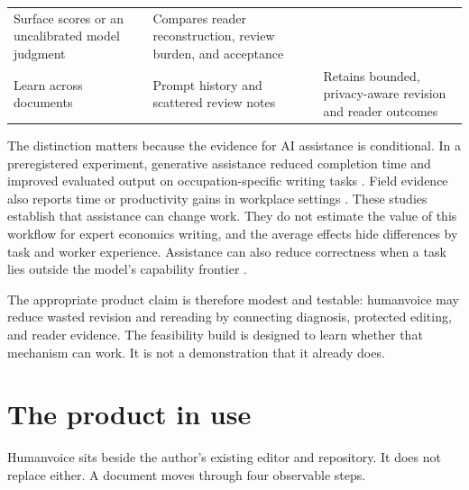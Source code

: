 \documentclass[
  11pt,
  english,
]{article}
\begin{document}
\begin{longtable}[]{@{}lll@{}}
\begin{minipage}[t]{0.30\columnwidth}
Surface scores or an uncalibrated model judgment\strut
\end{minipage} & \begin{minipage}[t]{0.30\columnwidth}\raggedright
Compares reader reconstruction, review burden, and acceptance\strut
\end{minipage}\tabularnewline
\begin{minipage}[t]{0.30\columnwidth}\raggedright
Learn across documents\strut
\end{minipage} & \begin{minipage}[t]{0.30\columnwidth}\raggedright
Prompt history and scattered review notes\strut
\end{minipage} & \begin{minipage}[t]{0.30\columnwidth}\raggedright
Retains bounded, privacy-aware revision and reader outcomes\strut
\end{minipage}\tabularnewline
\bottomrule
\end{longtable}

The distinction matters because the evidence for AI assistance is
conditional. In a preregistered experiment, generative assistance
reduced completion time and improved evaluated output on
occupation-specific writing tasks \citep{noy2023experimental}. Field
evidence also reports time or productivity gains in workplace settings
\citep{dillon2025shifting, brynjolfsson2025work}. These studies
establish that assistance can change work. They do not estimate the
value of this workflow for expert economics writing, and the average
effects hide differences by task and worker experience. Assistance can
also reduce correctness when a task lies outside the model's capability
frontier \citep{dellacqua2026jagged}.

The appropriate product claim is therefore modest and testable:
humanvoice may reduce wasted revision and rereading by connecting
diagnosis, protected editing, and reader evidence. The feasibility build
is designed to learn whether that mechanism can work. It is not a
demonstration that it already does.

\hypertarget{the-product-in-use}{%
\section{The product in use}\label{the-product-in-use}}

Humanvoice sits beside the author's existing editor and repository. It
does not replace either. A document moves through four observable steps.
\end{document}
